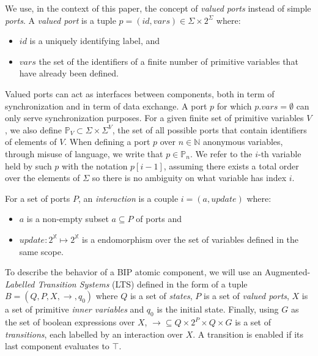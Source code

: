 \documentclass[runningheads]{llncs}
\begin{document}
\begin{definition}\label{def:PortModel}
    We use, in the context of this paper, the concept of \emph{valued ports} instead of simple \emph{ports}. A \emph{valued port} is a tuple $p = (id,vars) \in  \Sigma \times 2^\Sigma$ where:
    \begin{itemize}
        \item $id$ is a uniquely identifying label, and 
        \item $vars$ the set of the identifiers of a finite number of primitive variables that have already been defined.
    \end{itemize}
    Valued ports can act as interfaces between components, both in term of synchronization and in term of data exchange. A port $p$ for which $p.vars = \emptyset$ can only serve synchronization purposes. For a given finite set of primitive variables $V$, we also define $\mathbb{P}_V \subset \Sigma \times \Sigma^V$, the set of all possible ports that contain identifiers of elements of $V$. When defining a port $p$ over $n\in\mathbb{N}$ anonymous variables, through misuse of language, we write that $p \in \mathbb{P}_n$. We refer to the $i$-th variable held by such $p$ with the notation $p[i-1]$, assuming there exists a total order over the elements of $\Sigma$ so there is no ambiguity on what variable has index $i$.
\end{definition}

\begin{definition}\label{def:InteractionModel}
    For a set of ports $P$, an \emph{interaction} is a couple $i = (a, update)$ where:
    \begin{itemize}
        \item $a$ is a non-empty subset $a \subseteq P$ of ports and
        \item $update:2^\mathbb{X} \mapsto 2^\mathbb{X}$ is a endomorphism over the set of variables defined in the same scope.
    \end{itemize}
\end{definition}

\begin{definition}\label{def:BehaviorModel}
    To describe the behavior of a BIP atomic component, we will use an Augmented-\emph{Labelled Transition Systems} (LTS) defined in the form of a tuple $B = (Q,P,X,\rightarrow, q_0)$ where $Q$ is a set of \emph{states}, $P$ is a set of \emph{valued ports}, $X$ is a set of primitive \emph{inner variables} and $q_0$ is the initial state. Finally, using $G$ as the set of boolean expressions over $X$, $\rightarrow \subseteq Q \times 2^P \times Q \times G$ is a set of \emph{transitions}, each labelled by an interaction over $X$. A transition is enabled if its last component evaluates to $\top$.
\end{definition}
\end{document}
